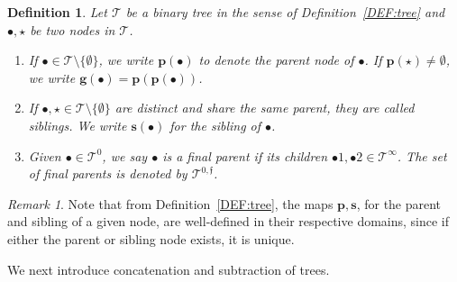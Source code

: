 \documentclass[a4paper,
11pt,  reqno]{amsart}
\newcommand{\5}{\textup{V}}
\newtheorem{definition}[theorem]{Definition}
\theoremstyle{remark}
\newtheorem{remark}[theorem]{Remark}
\newcommand{\bul}{\bullet}
\newcommand{\TT}{\mathcal{T}}
\newcommand{\pb}{\mathbf{p}}
\newcommand{\gb}{\mathbf{g}}
\newcommand{\sbf}{\mathbf{s}}
\newcommand{\ff}{\mathfrak{f}}
\numberwithin{equation}{section}
\numberwithin{theorem}{section}
\providecommand{\DIFaddtex}[1]{{\protect\color{blue}\uwave{#1}}} %
\providecommand{\DIFdeltex}[1]{{\protect\color{red}\sout{#1}}}                      %
\providecommand{\DIFaddbegin}{} %
\providecommand{\DIFaddend}{} %
\providecommand{\DIFdelbegin}{} %
\providecommand{\DIFdelend}{} %
\providecommand{\DIFadd}[1]{\texorpdfstring{\DIFaddtex{#1}}{#1}} %
\providecommand{\DIFdel}[1]{\texorpdfstring{\DIFdeltex{#1}}{}} %
\providecommand{\emptyser}{\emptyset}
\begin{document}
\begin{definition}\rm
\label{DEF:tree2}
Let $\TT$ be a binary tree in the sense of Definition~\ref{DEF:tree} and 
$\bul, \star$ be two nodes in $\TT$. 

\begin{enumerate}



\smallskip
\item[(i)]
If $\bul \in \TT\setminus \{ \emptyset\}$, we write $\pb(\bul)$ to denote the \emph{parent node} of $\bul$. If \DIFdelbegin \DIFdel{$\pb(\star)\neq \emptyser$}\DIFdelend \DIFaddbegin \DIFadd{$\pb(\bul)\neq \emptyset$}\DIFaddend , we write $\gb(\bul)=\pb(\pb(\bul))$.

\smallskip
\item[(ii)] 
If $\bul, \star\in \TT \setminus\{ \emptyset \}$ are distinct and share the same parent, they are called \textit{siblings}. We write $\sbf(\bul)$ for the sibling of $\bul$. 

\smallskip
\item[(iii)] 
Given $\bul\in \TT^0$, we say $\bul$ is a \textit{final parent} if its children $\bul1, \bul2 \in \TT^\infty$. The set of final parents is denoted by $\TT^{0,\ff}$.


\end{enumerate}



\end{definition}


\begin{remark}\rm 
Note that from Definition~\ref{DEF:tree}, the maps $\pb, \sbf$, for the parent and sibling of a given node, are well-defined in their respective domains, since if either the parent or sibling node exists, it is unique. 

\end{remark}





We next introduce concatenation and subtraction of trees. 
\end{document}
